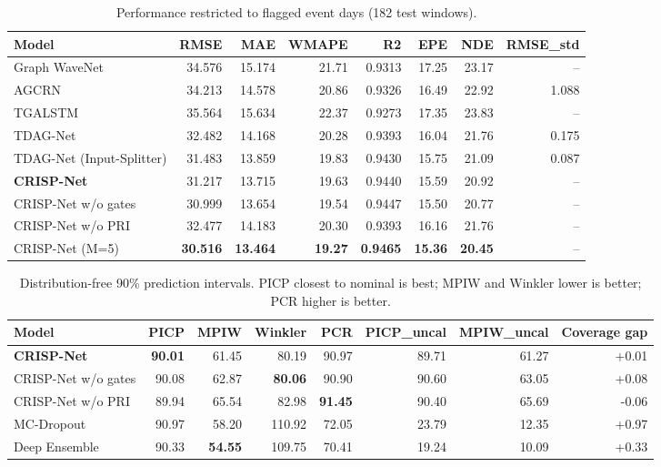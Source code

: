 \begin{table}[!t]
\caption{Performance restricted to flagged event days (182 test windows).}
\label{tab:event_results}
\centering
\footnotesize
\begin{tabular}{lrrrrrrr}
\toprule
Model & RMSE & MAE & WMAPE & R2 & EPE & NDE & RMSE_std \\
\midrule
Graph WaveNet & 34.576 & 15.174 & 21.71 & 0.9313 & 17.25 & 23.17 & -- \\
AGCRN & 34.213 & 14.578 & 20.86 & 0.9326 & 16.49 & 22.92 & 1.088 \\
TGALSTM & 35.564 & 15.634 & 22.37 & 0.9273 & 17.35 & 23.83 & -- \\
TDAG-Net & 32.482 & 14.168 & 20.28 & 0.9393 & 16.04 & 21.76 & 0.175 \\
TDAG-Net (Input-Splitter) & 31.483 & 13.859 & 19.83 & 0.9430 & 15.75 & 21.09 & 0.087 \\
\textbf{CRISP-Net} & 31.217 & 13.715 & 19.63 & 0.9440 & 15.59 & 20.92 & -- \\
CRISP-Net w/o gates & 30.999 & 13.654 & 19.54 & 0.9447 & 15.50 & 20.77 & -- \\
CRISP-Net w/o PRI & 32.477 & 14.183 & 20.30 & 0.9393 & 16.16 & 21.76 & -- \\
CRISP-Net (M=5) & \textbf{30.516} & \textbf{13.464} & \textbf{19.27} & \textbf{0.9465} & \textbf{15.36} & \textbf{20.45} & -- \\
\bottomrule
\end{tabular}
\end{table}

\begin{table}[!t]
\caption{Distribution-free 90\% prediction intervals. PICP closest to nominal is best; MPIW and Winkler lower is better; PCR higher is better.}
\label{tab:uncertainty}
\centering
\footnotesize
\begin{tabular}{lrrrrrrr}
\toprule
Model & PICP & MPIW & Winkler & PCR & PICP_uncal & MPIW_uncal & Coverage gap \\
\midrule
\textbf{CRISP-Net} & \textbf{90.01} & 61.45 & 80.19 & 90.97 & 89.71 & 61.27 & +0.01 \\
CRISP-Net w/o gates & 90.08 & 62.87 & \textbf{80.06} & 90.90 & 90.60 & 63.05 & +0.08 \\
CRISP-Net w/o PRI & 89.94 & 65.54 & 82.98 & \textbf{91.45} & 90.40 & 65.69 & -0.06 \\
MC-Dropout & 90.97 & 58.20 & 110.92 & 72.05 & 23.79 & 12.35 & +0.97 \\
Deep Ensemble & 90.33 & \textbf{54.55} & 109.75 & 70.41 & 19.24 & 10.09 & +0.33 \\
\bottomrule
\end{tabular}
\end{table}

